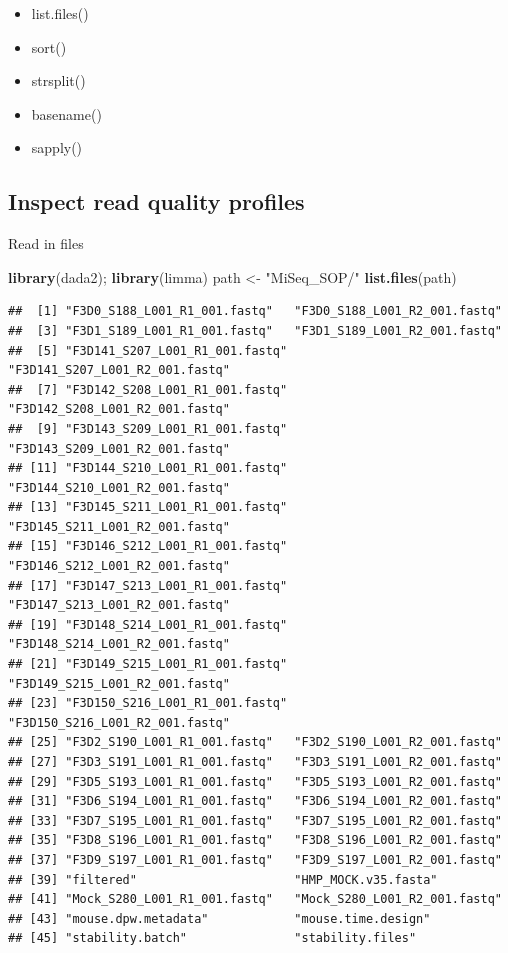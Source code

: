 \documentclass[
]{book}
\newenvironment{Shaded}{\begin{snugshade}}{\end{snugshade}}
\newcommand{\KeywordTok}[1]{\textcolor[rgb]{0.13,0.29,0.53}{\textbf{#1}}}
\newcommand{\NormalTok}[1]{#1}
\newcommand{\StringTok}[1]{\textcolor[rgb]{0.31,0.60,0.02}{#1}}
\providecommand{\tightlist}{%
  \setlength{\itemsep}{0pt}\setlength{\parskip}{0pt}}
\begin{document}
\begin{itemize}
\tightlist
\item
  list.files()
\item
  sort()
\item
  strsplit()
\item
  basename()
\item
  sapply()
\end{itemize}

\hypertarget{inspect-read-quality-profiles}{%
\subsection{Inspect read quality profiles}\label{inspect-read-quality-profiles}}

Read in files

\begin{Shaded}
\begin{Highlighting}[]
\KeywordTok{library}\NormalTok{(dada2);}
\KeywordTok{library}\NormalTok{(limma)}
\NormalTok{path <-}\StringTok{ "MiSeq_SOP/"}
\KeywordTok{list.files}\NormalTok{(path)}
\end{Highlighting}
\end{Shaded}

\begin{verbatim}
##  [1] "F3D0_S188_L001_R1_001.fastq"   "F3D0_S188_L001_R2_001.fastq"  
##  [3] "F3D1_S189_L001_R1_001.fastq"   "F3D1_S189_L001_R2_001.fastq"  
##  [5] "F3D141_S207_L001_R1_001.fastq" "F3D141_S207_L001_R2_001.fastq"
##  [7] "F3D142_S208_L001_R1_001.fastq" "F3D142_S208_L001_R2_001.fastq"
##  [9] "F3D143_S209_L001_R1_001.fastq" "F3D143_S209_L001_R2_001.fastq"
## [11] "F3D144_S210_L001_R1_001.fastq" "F3D144_S210_L001_R2_001.fastq"
## [13] "F3D145_S211_L001_R1_001.fastq" "F3D145_S211_L001_R2_001.fastq"
## [15] "F3D146_S212_L001_R1_001.fastq" "F3D146_S212_L001_R2_001.fastq"
## [17] "F3D147_S213_L001_R1_001.fastq" "F3D147_S213_L001_R2_001.fastq"
## [19] "F3D148_S214_L001_R1_001.fastq" "F3D148_S214_L001_R2_001.fastq"
## [21] "F3D149_S215_L001_R1_001.fastq" "F3D149_S215_L001_R2_001.fastq"
## [23] "F3D150_S216_L001_R1_001.fastq" "F3D150_S216_L001_R2_001.fastq"
## [25] "F3D2_S190_L001_R1_001.fastq"   "F3D2_S190_L001_R2_001.fastq"  
## [27] "F3D3_S191_L001_R1_001.fastq"   "F3D3_S191_L001_R2_001.fastq"  
## [29] "F3D5_S193_L001_R1_001.fastq"   "F3D5_S193_L001_R2_001.fastq"  
## [31] "F3D6_S194_L001_R1_001.fastq"   "F3D6_S194_L001_R2_001.fastq"  
## [33] "F3D7_S195_L001_R1_001.fastq"   "F3D7_S195_L001_R2_001.fastq"  
## [35] "F3D8_S196_L001_R1_001.fastq"   "F3D8_S196_L001_R2_001.fastq"  
## [37] "F3D9_S197_L001_R1_001.fastq"   "F3D9_S197_L001_R2_001.fastq"  
## [39] "filtered"                      "HMP_MOCK.v35.fasta"           
## [41] "Mock_S280_L001_R1_001.fastq"   "Mock_S280_L001_R2_001.fastq"  
## [43] "mouse.dpw.metadata"            "mouse.time.design"            
## [45] "stability.batch"               "stability.files"
\end{verbatim}
\end{document}
